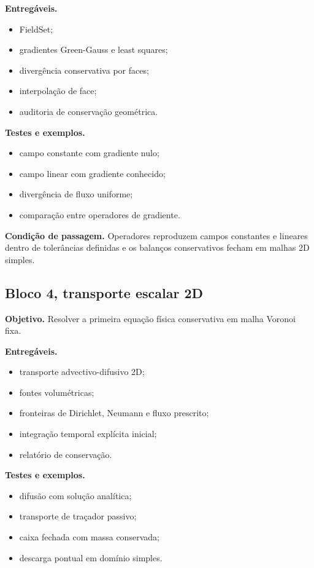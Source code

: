 \documentclass[11pt,a4paper]{article}
\begin{document}
\textbf{Entreg\'aveis.}
\begin{itemize}
  \item FieldSet;
  \item gradientes Green-Gauss e least squares;
  \item diverg\^encia conservativa por faces;
  \item interpola\c{c}\~ao de face;
  \item auditoria de conserva\c{c}\~ao geom\'etrica.
\end{itemize}

\textbf{Testes e exemplos.}
\begin{itemize}
  \item campo constante com gradiente nulo;
  \item campo linear com gradiente conhecido;
  \item diverg\^encia de fluxo uniforme;
  \item compara\c{c}\~ao entre operadores de gradiente.
\end{itemize}

\textbf{Condi\c{c}\~ao de passagem.} Operadores reproduzem campos constantes e lineares dentro de toler\^ancias definidas e os balan\c{c}os conservativos fecham em malhas 2D simples.

\subsection*{Bloco 4, transporte escalar 2D}

\textbf{Objetivo.} Resolver a primeira equa\c{c}\~ao f\'isica conservativa em malha Voronoi fixa.

\textbf{Entreg\'aveis.}
\begin{itemize}
  \item transporte advectivo-difusivo 2D;
  \item fontes volum\'etricas;
  \item fronteiras de Dirichlet, Neumann e fluxo prescrito;
  \item integra\c{c}\~ao temporal expl\'icita inicial;
  \item relat\'orio de conserva\c{c}\~ao.
\end{itemize}

\textbf{Testes e exemplos.}
\begin{itemize}
  \item difus\~ao com solu\c{c}\~ao anal\'itica;
  \item transporte de tra\c{c}ador passivo;
  \item caixa fechada com massa conservada;
  \item descarga pontual em dom\'inio simples.
\end{itemize}
\end{document}
